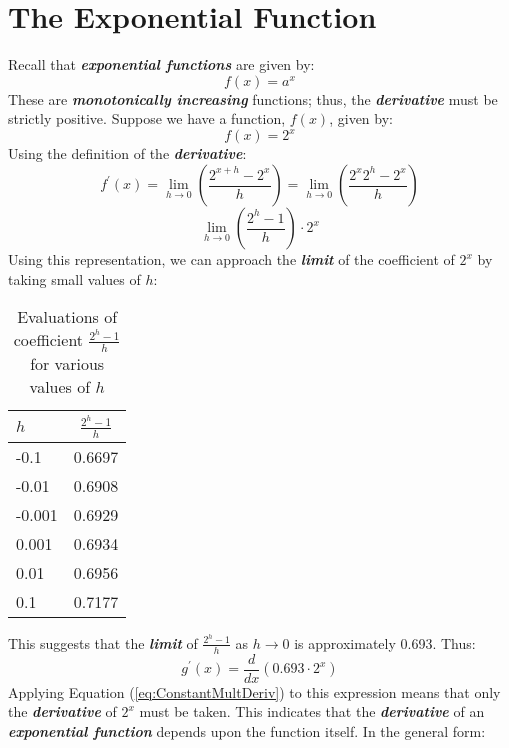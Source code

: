 \section{The Exponential Function}
Recall that \textbf{\textit{exponential functions}} are given by:
\begin{equation}
f(x) = a^x
\end{equation}
These are \textbf{\textit{monotonically increasing}} functions; thus, the \textbf{\textit{derivative}} must be strictly positive. Suppose we have a function, $f(x)$, given by:
\begin{equation}
f(x) = 2^x
\end{equation}
Using the definition of the \textbf{\textit{derivative}}:
\begin{equation}
f^\prime(x) = \lim_{h \rightarrow 0} \left(\frac{2^{x+h} - 2^x}{h}\right) = \lim_{h \rightarrow 0} \left(\frac{{2^x 2^h} - 2^x}{h}\right)
\end{equation}
%
\begin{equation}
\lim_{h \rightarrow 0} \left(\frac{2^h - 1}{h}\right)\cdot 2^x
\end{equation}
%
Using this representation, we can approach the \textbf{\textit{limit}} of the coefficient of $2^x$ by taking small values of $h$:
%
\begin{table}[tb]
\begin{center}
\caption{Evaluations of coefficient $\frac{2^h - 1}{h}$ for various values of $h$}
\begin{tabular}{l|c}
\hline
$h$ & $\frac{2^h - 1}{h}$\\
\hline
-0.1 & 0.6697\\
-0.01 & 0.6908\\
-0.001 & 0.6929\\
0.001 & 0.6934\\
0.01 & 0.6956\\
0.1 & 0.7177\\
\hline
\end{tabular}
\end{center}
\end{table}
%
This suggests that the \textbf{\textit{limit}} of $\frac{2^h - 1}{h}$ as $h \rightarrow 0$ is approximately 0.693. Thus:
%
\begin{equation}
g^\prime(x) = \frac{d}{dx} \left(0.693\cdot 2^x\right)
\end{equation}
%
Applying Equation (\ref{eq:ConstantMultDeriv}) to this expression means that only the \textbf{\textit{derivative}} of $2^x$ must be taken. This indicates that the \textbf{\textit{derivative}} of an \textbf{\textit{exponential function}} depends upon the function itself. In the general form:
